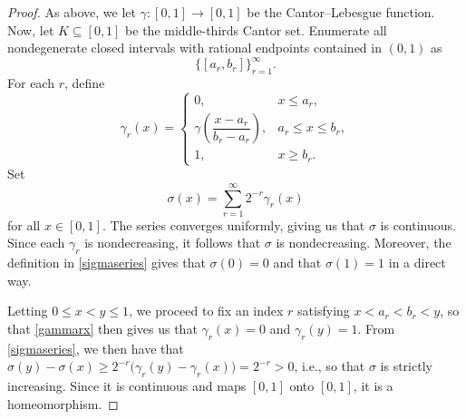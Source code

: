 \documentclass[10pt,a4paper]{amsart}
\begin{document}
\begin{proof}
 As above, we let \(\gamma:[0,1]\to[0,1]\) be the Cantor--Lebesgue function. Now, let
 $K \subseteq [0,1]$ be the middle-thirds Cantor set. Enumerate all nondegenerate
closed intervals with rational endpoints contained in \((0,1)\) as
\begin{equation}\label{countclosed}
 \{[a_r,b_r]\}_{r=1}^{\infty}.
\end{equation}
For each $r$, define 
\begin{equation}\label{gammarx}
\gamma_r(x) =
\begin{cases}
0, & x\le a_r,\\[4pt]
\gamma\!\left(\dfrac{x-a_r}{b_r-a_r}\right),
& a_r\le x\le b_r,\\[10pt]
1, & x\ge b_r.
\end{cases}
\end{equation}
Set
\begin{equation}\label{sigmaseries}
\sigma(x)=\sum_{r=1}^{\infty}2^{-r}\gamma_r(x) 
\end{equation}
 for all $x \in [0, 1]$. 
 The series converges uniformly, giving us that \(\sigma\) is continuous. Since each
\(\gamma_r\) is nondecreasing, it follows that \(\sigma\) is nondecreasing. Moreover, 
 the definition in \eqref{sigmaseries}
 gives that 
 $ \sigma(0)=0$ and that $\sigma(1)=1$ in a direct way. 
 
 Letting $0 \le x < y \le1$, we proceed to fix an index 
$r$ satisfying $
x<a_r<b_r<y$, so that \eqref{gammarx} then gives us that 
 $\gamma_r(x) = 0$ and $\gamma_r(y)=1$. From \eqref{sigmaseries}, 
 we then have that 
$
\sigma(y)-\sigma(x)
\ge
2^{-r}\bigl(\gamma_r(y)-\gamma_r(x)\bigr)
=
2^{-r}>0$, i.e., so that $\sigma$ is strictly increasing. Since it is continuous and maps
\([0,1]\) onto \([0,1]\), it is a homeomorphism. 


\end{proof}
\end{document}
